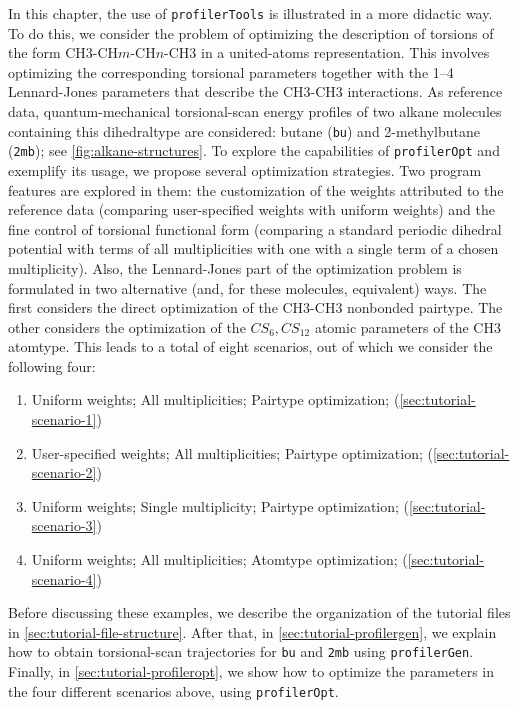 \documentclass[10pt,a4paper]{report}
\numberwithin{equation}{section}
\newcommand{\profileropt}[0]{\texttt{profilerOpt}}
\newcommand{\profilergen}[0]{\texttt{profilerGen}}
\newcommand{\profilertools}[0]{\texttt{profilerTools}}
\begin{document}
In this chapter, the use of \profilertools{} is illustrated in a more
didactic way.
%
To do this, we consider the problem of optimizing the description of
torsions of the form CH3-CH$m$-CH$n$-CH3 in a united-atoms
representation.
%
This involves optimizing the corresponding torsional parameters
together with the 1--4 Lennard-Jones parameters that describe the
CH3-CH3 interactions.
%
As reference data, quantum-mechanical torsional-scan energy profiles
of two alkane molecules containing this dihedraltype are considered:
butane (\texttt{bu}) and 2-methylbutane (\texttt{2mb}); see
\autoref{fig:alkane-structures}.
%
To explore the capabilities of \profileropt{} and exemplify its usage,
we propose several optimization strategies.
%
Two program features are explored in them:
%
the customization of the weights attributed to the reference data
(comparing user-specified weights with uniform weights) and the fine
control of torsional functional form (comparing a standard periodic
dihedral potential with terms of all multiplicities with one with a
single term of a chosen multiplicity).
%
Also, the Lennard-Jones part of the optimization problem is formulated
in two alternative (and, for these molecules, equivalent) ways.
%
The first considers the direct optimization of the CH3-CH3 nonbonded
pairtype.
%
The other considers the optimization of the $CS_6,CS_{12}$ atomic
parameters of the CH3 atomtype.
%
This leads to a total of eight scenarios, out of which we consider the
following four:
%
\begin{enumerate}
\item Uniform weights; All multiplicities; Pairtype optimization;
  (\autoref{sec:tutorial-scenario-1})
\item User-specified weights; All multiplicities; Pairtype
  optimization; (\autoref{sec:tutorial-scenario-2})
\item Uniform weights; Single multiplicity; Pairtype optimization;
  (\autoref{sec:tutorial-scenario-3})
\item Uniform weights; All multiplicities; Atomtype optimization;
  (\autoref{sec:tutorial-scenario-4})
\end{enumerate}
%
Before discussing these examples, we describe the organization of the
tutorial files in \autoref{sec:tutorial-file-structure}.  After that,
in \autoref{sec:tutorial-profilergen}, we explain how to obtain
torsional-scan trajectories for \texttt{bu} and \texttt{2mb} using
\profilergen{}. Finally, in \autoref{sec:tutorial-profileropt}, we
show how to optimize the parameters in the four different scenarios
above, using \profileropt{}.
\end{document}
